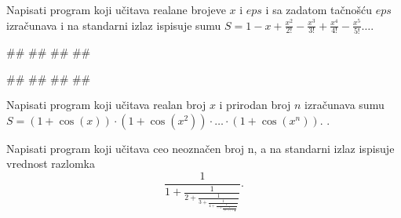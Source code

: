 \begin{Exercise}[difficulty=1, label=p1.3_13]
Napisati program koji učitava realane brojeve $x$ i $eps$ i sa zadatom
tačnošću $eps$ izračunava i na standarni izlaz ispisuje sumu
$S=1-x+\frac{x^2}{2!}-\frac{x^3}{3!}+\frac{x^4}{4!}-\frac{x^5}{5!}\ldots$. 
  
\begin{miditest}
\begin{upotreba}{1}
#\naslovInt#
##
##
##
\end{upotreba}
\end{miditest}
\begin{miditest}
\begin{upotreba}{2}
#\naslovInt#
##
##
##
\end{upotreba}
\end{miditest}
\end{Exercise}
\begin{Answer}[ref=p1.3_13]
\end{Answer}

\begin{Exercise}[label=p1.7_] 
Napisati program koji učitava realan broj $x$ i prirodan broj $n$
izra\v cunava sumu $S = (1 + \cos(x))\cdot(1 + \cos(x^2))\cdot \ldots
\cdot(1 + \cos(x^n))$. .  
\end{Exercise}
\begin{Answer}[ref=p1.7_]
\end{Answer}


\begin{Exercise}[difficulty=1, label=p1.7_] 
Napisati program koji učitava ceo neoznačen broj n, a na standarni
izlaz ispisuje vrednost razlomka\\
	\[
		\frac{1}{1 + \frac{1}{2 + \frac{1}{3 + \frac{1}{4 + \frac{1}{\ldots + \frac{1}{(n-1) + \frac{1}{n}}}}}}}.
	\]
 \\
\end{Exercise}
\begin{Answer}[ref=p1.7_]
\end{Answer}

